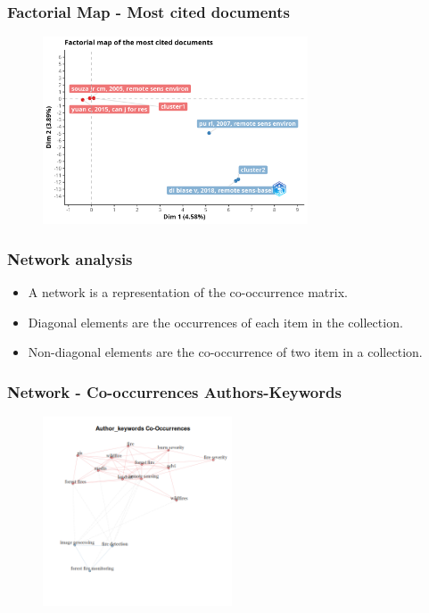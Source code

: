 \documentclass[aspectratio=169]{beamer}
\begin{document}
\begin{frame}
	\frametitle{Factorial Map - Most cited documents}
	\begin{figure}
		\centering
		\includegraphics[width=0.7\textwidth]{figures/con_stru_map_cited.png}
	\end{figure}
\end{frame}

\begin{frame}
	\frametitle{Network analysis}
	\begin{itemize}
		\item A network is a representation of the co-occurrence matrix.
		\item Diagonal elements are the occurrences of each item in the collection.
		\item Non-diagonal elements are the co-occurrence of two item in a
		      collection.
	\end{itemize}
\end{frame}

\begin{frame}
	\frametitle{Network - Co-occurrences Authors-Keywords}
	\begin{figure}
		\centering
		\includegraphics[width=0.5\textwidth]
		{figures/bnet_author_keywords_co-occurrences.png}
	\end{figure}
\end{frame}
\end{document}
